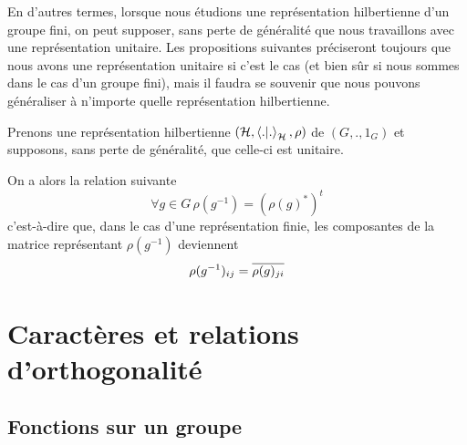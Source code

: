 En d'autres termes, lorsque nous étudions une représentation hilbertienne d'un
groupe fini, on peut
supposer, sans perte de généralité que nous travaillons avec une représentation
unitaire.
Les propositions suivantes préciseront toujours que nous avons une
représentation unitaire si c'est le cas (et bien sûr si nous sommes dans le cas
d'un groupe fini), mais il faudra se souvenir que nous
pouvons généraliser à n'importe quelle représentation hilbertienne.





\begin{remarque}
	Prenons une représentation hilbertienne $(\mathcal{H}, \bra{.}\ket{.}_{\mathcal{H}}, \rho)$ de
	$(G, ., 1_{G})$ et supposons, sans perte de généralité, que celle-ci est
	unitaire.

	On a alors la relation suivante
	\begin{equation}
		\forall g \in G \, \rho(g^{-1}) = {(\rho(g)^{*})}^{t}
	\end{equation}
	c'est-à-dire que, dans le cas d'une représentation finie, les composantes de
	la matrice représentant $\rho(g^{-1})$
	deviennent
	\begin{equation}
		\rho(g^{-1})_{ij} = \overline{\rho(g)_{ji}}
	\end{equation}
\end{remarque}

\section{Caractères et relations d'orthogonalité}

\subsection{Fonctions sur un groupe}

